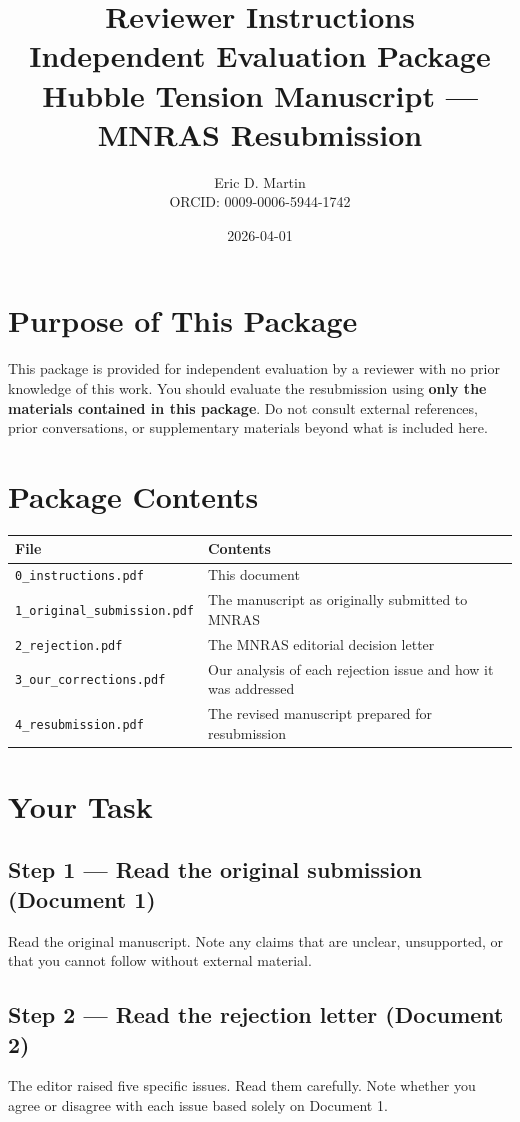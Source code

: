 \documentclass[12pt,a4paper]{article}
\title{\textbf{Reviewer Instructions}\\
\large Independent Evaluation Package\\
\normalsize Hubble Tension Manuscript — MNRAS Resubmission}
\author{Eric D. Martin \\ ORCID: 0009-0006-5944-1742}
\date{2026-04-01}
\begin{document}
\maketitle
\thispagestyle{empty}

\section*{Purpose of This Package}

This package is provided for independent evaluation by a reviewer
with no prior knowledge of this work. You should evaluate the
resubmission using \textbf{only the materials contained in this
package}. Do not consult external references, prior conversations,
or supplementary materials beyond what is included here.

\section*{Package Contents}

\begin{tabular}{ll}
\toprule
File & Contents \\
\midrule
\texttt{0\_instructions.pdf} & This document \\
\texttt{1\_original\_submission.pdf} & The manuscript as originally submitted to MNRAS \\
\texttt{2\_rejection.pdf} & The MNRAS editorial decision letter \\
\texttt{3\_our\_corrections.pdf} & Our analysis of each rejection issue and how it was addressed \\
\texttt{4\_resubmission.pdf} & The revised manuscript prepared for resubmission \\
\bottomrule
\end{tabular}

\section*{Your Task}

\subsection*{Step 1 — Read the original submission (Document 1)}
Read the original manuscript. Note any claims that are unclear,
unsupported, or that you cannot follow without external material.

\subsection*{Step 2 — Read the rejection letter (Document 2)}
The editor raised five specific issues. Read them carefully.
Note whether you agree or disagree with each issue based solely
on Document 1.
\end{document}
